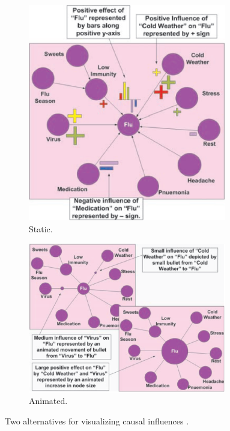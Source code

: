 \begin{figure}
\centering
	\begin{subfigure}[b]{0.45\textwidth}
		\centering
		\includegraphics[width=0.95\textwidth]{figures/eps/kadaba_static.eps}
		\caption{Static.}
		\label{fig:kadabaStatic}
	\end{subfigure}	
	\begin{subfigure}[b]{0.45\textwidth}
		\centering
		\includegraphics[width=0.95\textwidth]{figures/eps/kadaba_animated.eps}
		\caption{Animated.}
		\label{fig:kadabaAnimated}
	\end{subfigure}
	\caption{Two alternatives for visualizing causal influences \cite{kadaba2007}.}
	\label{fig:kadaba}
\end{figure}

